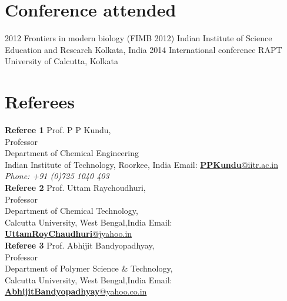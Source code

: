 \documentclass[]{friggeri-cv}
\begin{document}
\section{Conference attended}
\begin{entrylist}
\entry
	{2012}
	{Frontiers in modern biology (FIMB 2012)}
	{Indian Institute of Science Education and Research Kolkata, India }
	{}
\entry
	{2014}
	{International conference RAPT}
	{University of Calcutta, Kolkata}
	{}
\end{entrylist}

\newpage
\section{Referees}
\begin{entrylist}
	\entry
	{\textbf{Referee 1}}
	{Prof. P P Kundu, \\Professor\\Department of Chemical Engineering
		\\Indian Institute of Technology, Roorkee, India}
	{}
	{Email: \href{mailto: ppkfch@iitr.ac.in}{\textbf{PPKundu}@iitr.ac.in}\\
	\emph{Phone: +91 (0)725 1040 403}}
\\
\entry
	{\textbf{Referee 2}}
	{Prof. Uttam Raychoudhuri, \\Professor \\ Department of Chemical Technology, \\Calcutta University, West Bengal,India}
	{}
	{Email: \href{mailto: uttamraychaudhuri@yahoo.in}{\textbf{UttamRoyChaudhuri}@jyahoo.in}}\\
\entry
	{\textbf{Referee 3}}
	{Prof. Abhijit Bandyopadhyay, \\Professor \\ Department of Polymer Science \& Technology, \\Calcutta University, West Bengal,India}
	{}
	{Email: \href{mailto: abhijitbandyopadhyay@yahoo.co.in}{\textbf{AbhijitBandyopadhyay}@yahoo.co.in}}\\
	\end{entrylist}
\begin{aside}
~
	\end{aside}

\end{document}
